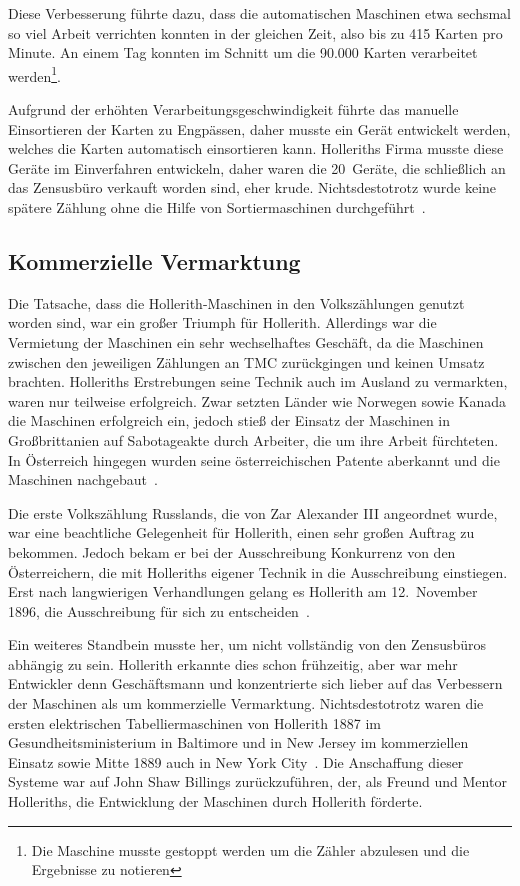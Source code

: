 \documentclass[parskip=half]{scrartcl}
\begin{document}
Diese Verbesserung führte dazu, dass die automatischen Maschinen etwa sechsmal
so viel Arbeit verrichten konnten in der gleichen Zeit, also bis zu 415 Karten
pro Minute. An einem Tag konnten im Schnitt um die 90.000 Karten verarbeitet
werden\footnote{Die Maschine musste gestoppt werden um die Zähler abzulesen und
die Ergebnisse zu notieren}.

Aufgrund der erhöhten Verarbeitungsgeschwindigkeit führte das manuelle
Einsortieren der Karten zu Engpässen, daher musste ein Gerät entwickelt werden,
welches die Karten automatisch einsortieren kann. Holleriths Firma musste diese
Geräte im Einverfahren entwickeln, daher waren die 20~Geräte, die schließlich an
das Zensusbüro verkauft worden sind, eher krude. Nichtsdestotrotz wurde keine
spätere Zählung ohne die Hilfe von Sortiermaschinen
durchgeführt~\cite{truesdell1965development}.

\subsection{Kommerzielle Vermarktung}
\label{sec:commerce}

Die Tatsache, dass die Hollerith-Maschinen in den Volkszählungen genutzt worden
sind, war ein großer Triumph für Hollerith. Allerdings war die Vermietung der
Maschinen ein sehr wechselhaftes Geschäft, da die Maschinen zwischen den
jeweiligen Zählungen an TMC zurückgingen und keinen Umsatz brachten.
Holleriths Erstrebungen seine Technik auch im Ausland zu vermarkten, waren nur
teilweise erfolgreich. Zwar setzten Länder wie Norwegen sowie Kanada die
Maschinen erfolgreich ein, jedoch stieß der Einsatz der Maschinen in
Großbrittanien auf Sabotageakte durch Arbeiter, die um ihre Arbeit fürchteten.
In Österreich hingegen wurden seine österreichischen Patente aberkannt und die Maschinen
nachgebaut~\cite{austrian1982herman}.

Die erste Volkszählung Russlands, die von Zar Alexander III angeordnet wurde, war
eine beachtliche Gelegenheit für Hollerith, einen sehr großen Auftrag zu
bekommen. Jedoch bekam er bei der Ausschreibung Konkurrenz von den
Österreichern, die mit Holleriths eigener Technik in die Ausschreibung
einstiegen. Erst nach langwierigen Verhandlungen gelang es Hollerith am
12.~November 1896, die Ausschreibung für sich zu entscheiden~\cite{austrian1982herman}.

Ein weiteres Standbein musste her, um nicht vollständig von den Zensusbüros
abhängig zu sein. Hollerith erkannte dies schon frühzeitig, aber war mehr
Entwickler denn Geschäftsmann und konzentrierte sich lieber auf das Verbessern
der Maschinen als um kommerzielle Vermarktung. Nichtsdestotrotz waren die
ersten elektrischen Tabelliermaschinen von Hollerith 1887 im
Gesundheitsministerium in Baltimore und in New Jersey im kommerziellen Einsatz
sowie Mitte 1889 auch in New York City~\cite{austrian1982herman}. Die
Anschaffung dieser Systeme war auf John Shaw Billings zurückzuführen, der, als
Freund und Mentor Holleriths, die Entwicklung der Maschinen durch Hollerith
förderte.
\end{document}

